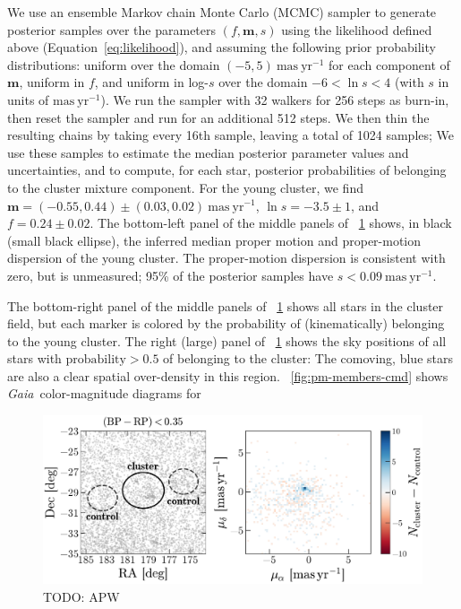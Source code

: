 \documentclass[modern]{aastex62}
\newcommand{\gaia}{\textsl{Gaia}}
\newcommand{\todo}[1]{{\color{red} TODO: #1}}
\newcommand{\bs}[1]{\boldsymbol{#1}}
\newcommand{\masyr}{\ensuremath{\textrm{mas}~\textrm{yr}^{-1}}}
\begin{document}
We use an ensemble Markov chain Monte Carlo (MCMC) sampler \citep[\texttt{emcee}][]{Goodman:XX, Foreman-Mackey:2013} to generate posterior samples over the parameters $(f, \bs{m}, s)$ using the likelihood defined above (Equation~\ref{eq:likelihood}), and assuming the following prior probability distributions: uniform over the domain $(-5, 5)~\masyr$ for each component of $\bs{m}$, uniform in $f$, and uniform in log-$s$ over the domain $-6 < \ln s < 4$ (with $s$ in units of \masyr).
We run the sampler with 32 walkers for 256 steps as burn-in, then reset the sampler and run for an additional 512 steps.
We then thin the resulting chains by taking every 16th sample, leaving a total of 1024 samples; We use these samples to estimate the median posterior parameter values and uncertainties, and to compute, for each star, posterior probabilities of belonging to the cluster mixture component.
For the young cluster, we find $\bs{m} = (-0.55,  0.44) \pm (0.03, 0.02)~\masyr$, $\ln s = -3.5 \pm 1$, and $f = 0.24 \pm 0.02$.
The bottom-left panel of the middle panels of \figurename~\ref{fig:pm-members} shows, in black (small black ellipse), the inferred median proper motion and proper-motion dispersion of the young cluster.
The proper-motion dispersion is consistent with zero, but is unmeasured; 95\% of the posterior samples have $s < 0.09~\masyr$.

The bottom-right panel of the middle panels of \figurename~\ref{fig:pm-members} shows all stars in the cluster field, but each marker is colored by the probability of (kinematically) belonging to the young cluster.
The right (large) panel of \figurename~\ref{fig:pm-members} shows the sky positions of all stars with $\textrm{probability} > 0.5$ of belonging to the cluster: The comoving, blue stars are also a clear spatial over-density in this region.
\figurename~\ref{fig:pm-members-cmd} shows \gaia\ color-magnitude diagrams for

\begin{figure}
\centering
\includegraphics[width=\textwidth]{figures/pm-model.pdf}
\caption{\todo{APW}
}
\label{fig:pm-members}
\end{figure}
\end{document}
